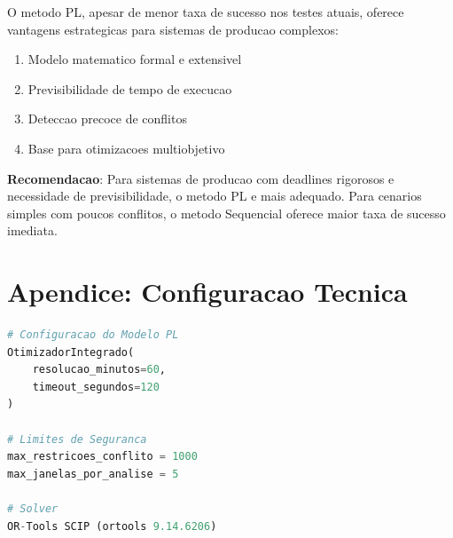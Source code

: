 \documentclass[12pt,a4paper]{article}
\begin{document}
O metodo PL, apesar de menor taxa de sucesso nos testes atuais, oferece vantagens estrategicas para sistemas de producao complexos:

\begin{enumerate}
    \item Modelo matematico formal e extensivel
    \item Previsibilidade de tempo de execucao
    \item Deteccao precoce de conflitos
    \item Base para otimizacoes multiobjetivo
\end{enumerate}

\textbf{Recomendacao}: Para sistemas de producao com deadlines rigorosos e necessidade de previsibilidade, o metodo PL e mais adequado. Para cenarios simples com poucos conflitos, o metodo Sequencial oferece maior taxa de sucesso imediata.

\section{Apendice: Configuracao Tecnica}

\begin{lstlisting}[language=Python,basicstyle=\footnotesize\ttfamily]
# Configuracao do Modelo PL
OtimizadorIntegrado(
    resolucao_minutos=60,
    timeout_segundos=120
)

# Limites de Seguranca
max_restricoes_conflito = 1000
max_janelas_por_analise = 5

# Solver
OR-Tools SCIP (ortools 9.14.6206)
\end{lstlisting}
\end{document}
